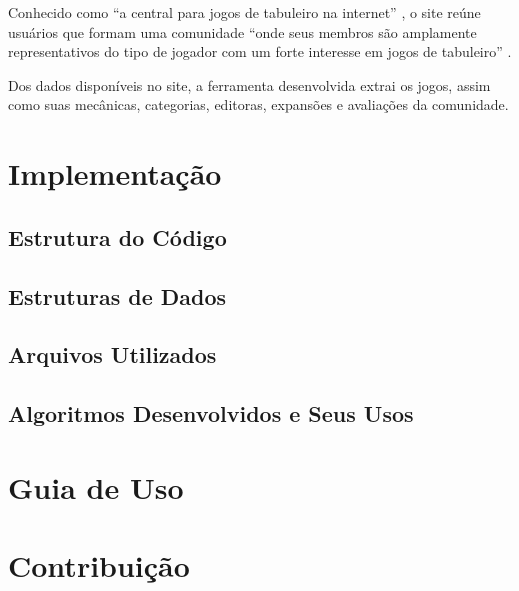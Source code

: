 \documentclass[hidelinks,article,twocolumn,brazil]{abntex2}
\begin{document}
Conhecido como ``a central para jogos de tabuleiro na internet'' \cite{draper2019bgg}, o site reúne usuários que formam uma comunidade ``onde seus membros são amplamente representativos do tipo de jogador com um forte interesse em jogos de tabuleiro'' \cite{woods2012eurogames}.

Dos dados disponíveis no site, a ferramenta desenvolvida extrai os jogos, assim como suas mecânicas, categorias, editoras, expansões e avaliações da comunidade.

\section{Implementação}

\subsection{Estrutura do Código}

\subsection{Estruturas de Dados}

\subsection{Arquivos Utilizados}

\subsection{Algoritmos Desenvolvidos e Seus Usos}

\section{Guia de Uso}

\section{Contribuição}


\end{document}
